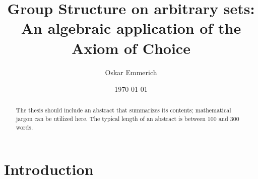 \documentclass[a4paper,12pt]{memoir}
\numberwithin{equation}{section} %
\theoremstyle{plain} %
\theoremstyle{definition} %
\theoremstyle{remark} %
\begin{document}

\author{Oskar Emmerich}

\title{Group Structure on arbitrary sets:\\An algebraic application of the Axiom of Choice}

\date{\today}



\frontmatter %


\thispagestyle{empty}

\begin{abstract}
  The thesis should include an abstract that summarizes its contents;
  mathematical jargon can be utilized here. The typical length of an abstract is
  between 100 and 300 words.
\end{abstract}



%



\cleardoublepage

\tableofcontents*



\chapter*{Introduction}




\mainmatter %
\end{document}
